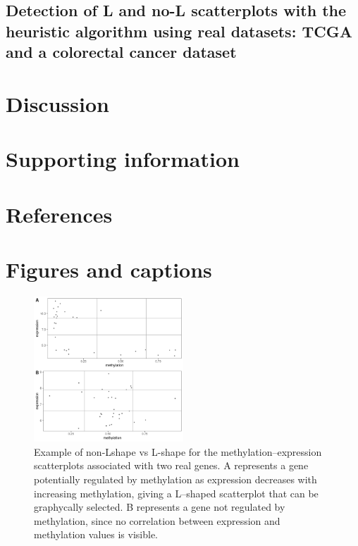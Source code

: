 \documentclass[10pt,letterpaper]{article}
\begin{document}
\hypertarget{detection-of-l-and-no-l-scatterplots-with-the-heuristic-algorithm-using-real-datasets-tcga-and-a-colorectal-cancer-dataset}{%
\subsection{Detection of L and no-L scatterplots with the heuristic
algorithm using real datasets: TCGA and a colorectal cancer
dataset}\label{detection-of-l-and-no-l-scatterplots-with-the-heuristic-algorithm-using-real-datasets-tcga-and-a-colorectal-cancer-dataset}}

\hypertarget{discussion}{%
\section{Discussion}\label{discussion}}

\hypertarget{supporting-information}{%
\section{Supporting information}\label{supporting-information}}

\hypertarget{references}{%
\section*{References}\label{references}}

\clearpage

\hypertarget{figures-and-captions}{%
\section{Figures and captions}\label{figures-and-captions}}

\begin{figure}
\hypertarget{id}{%
\centering
\includegraphics[width=0.5\textwidth,height=1\textheight]{figures/Figure1.png}
\caption{Example of non-Lshape vs L-shape for the
methylation--expression scatterplots associated with two real genes. A
represents a gene potentially regulated by methylation as expression
decreases with increasing methylation, giving a L--shaped scatterplot
that can be graphycally selected. B represents a gene not regulated by
methylation, since no correlation between expression and methylation
values is visible.}\label{id}
}
\end{figure}
\end{document}
